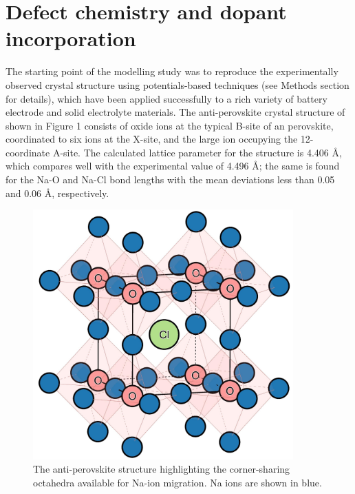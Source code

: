 \documentclass[12pt]{report}
\begin{document}
\section{Defect chemistry and dopant incorporation}

The starting point of the modelling study was to reproduce the experimentally observed crystal structure using potentials-based techniques (see Methods section for details), which have been applied successfully to a rich variety of battery electrode and solid electrolyte materials.\cite{clarke2021, dawson2018c, islam2014} 
The anti-perovskite crystal structure of  shown in Figure 1 consists of oxide ions at the typical B-site of an  perovskite, coordinated to six  ions at the X-site, and the large  ion occupying the 12-coordinate A-site. 
The calculated lattice parameter for the structure is 4.406 Å, which compares well with the experimental value of 4.496 Å; the same is found for the Na-O and Na-Cl bond lengths with the mean deviations less than 0.05 and 0.06 Å, respectively.\cite{hippler1990}

\begin{figure}[h]
\centering
\includegraphics[width=10cm]{./figures/structure_inverted_nolabel.jpeg}
\caption{The  anti-perovskite structure highlighting the corner-sharing  octahedra available for Na-ion migration. Na ions are shown in blue.}
\label{structure}
\end{figure}
\end{document}
